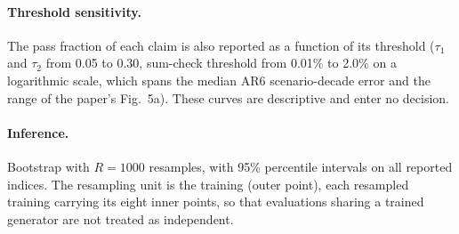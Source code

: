 \documentclass[11pt,a4paper]{article}
\begin{document}
\paragraph{Threshold sensitivity.} The pass fraction of each claim is
also reported as a function of its threshold ($\tau_1$ and $\tau_2$ from
0.05 to 0.30, sum-check threshold from 0.01\% to 2.0\% on a logarithmic
scale, which spans the median AR6 scenario-decade error and the range of
the paper's Fig.~5a). These curves are
descriptive and enter no decision.

\paragraph{Inference.} Bootstrap with $R=1000$ resamples, with 95\%
percentile intervals on all reported indices. The resampling unit is the
training (outer point), each resampled training carrying its eight inner
points, so that evaluations sharing a trained generator are not treated as
independent.
\end{document}

